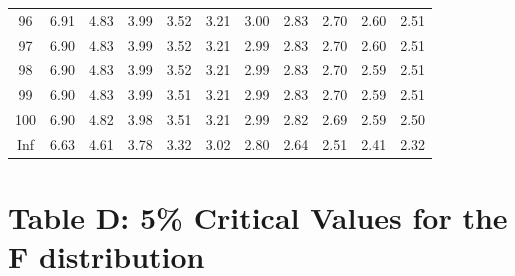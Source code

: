 \documentclass[
]{book}
\theoremstyle{definition}
\theoremstyle{definition}
\theoremstyle{definition}
\theoremstyle{definition}
\theoremstyle{remark}
\begin{document}
\begin{longtable}[]{@{}ccccccccccc@{}}
96 & 6.91 & 4.83 & 3.99 & 3.52 & 3.21 & 3.00 & 2.83 & 2.70 & 2.60 & 2.51 \\
97 & 6.90 & 4.83 & 3.99 & 3.52 & 3.21 & 2.99 & 2.83 & 2.70 & 2.60 & 2.51 \\
98 & 6.90 & 4.83 & 3.99 & 3.52 & 3.21 & 2.99 & 2.83 & 2.70 & 2.59 & 2.51 \\
99 & 6.90 & 4.83 & 3.99 & 3.51 & 3.21 & 2.99 & 2.83 & 2.70 & 2.59 & 2.51 \\
100 & 6.90 & 4.82 & 3.98 & 3.51 & 3.21 & 2.99 & 2.82 & 2.69 & 2.59 & 2.50 \\
Inf & 6.63 & 4.61 & 3.78 & 3.32 & 3.02 & 2.80 & 2.64 & 2.51 & 2.41 & 2.32 \\
\bottomrule()
\end{longtable}

\hypertarget{table-d-5-critical-values-for-the-f-distribution}{%
\section*{Table D: 5\% Critical Values for the F distribution}\label{table-d-5-critical-values-for-the-f-distribution}}
\end{document}

